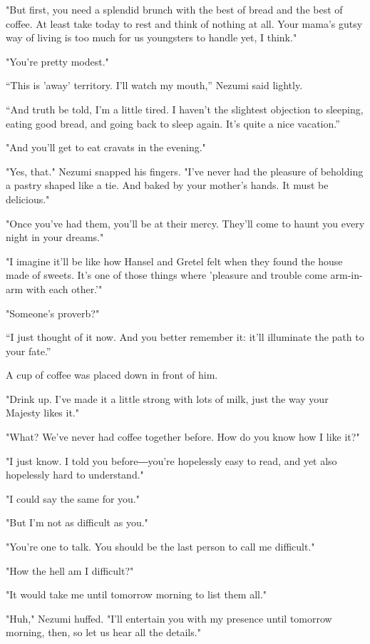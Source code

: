 "But first, you need a splendid brunch with the best of bread and the
best of coffee. At least take today to rest and think of nothing at all.
Your mama's gutsy way of living is too much for us youngsters to handle
yet, I think."

"You're pretty modest."

``This is 'away' territory. I'll watch my mouth,'' Nezumi said lightly.~

``And truth be told, I'm a little tired. I haven't the slightest
objection to sleeping, eating good bread, and going back to sleep again.
It's quite a nice vacation.''

"And you'll get to eat cravats in the evening."

"Yes, that." Nezumi snapped his fingers. "I've never had the pleasure of
beholding a pastry shaped like a tie. And baked by your mother's hands.
It must be delicious."

"Once you've had them, you'll be at their mercy. They'll come to haunt
you every night in your dreams."

"I imagine it'll be like how Hansel and Gretel felt when they found the
house made of sweets. It's one of those things where 'pleasure and
trouble come arm-in-arm with each other.'"

"Someone's proverb?"

``I just thought of it now. And you better remember it: it'll illuminate
the path to your fate.''

A cup of coffee was placed down in front of him.

"Drink up. I've made it a little strong with lots of milk, just the way
your Majesty likes it."

"What? We've never had coffee together before. How do you know how I
like it?"

"I just know. I told you before―you're hopelessly easy to read, and yet
also hopelessly hard to understand."

"I could say the same for you."

"But I'm not as difficult as you."

"You're one to talk. You should be the last person to call me
difficult."

"How the hell am I difficult?"

"It would take me until tomorrow morning to list them all."

"Huh," Nezumi huffed. "I'll entertain you with my presence until
tomorrow morning, then, so let us hear all the details."

